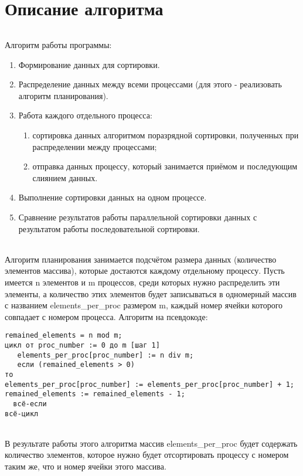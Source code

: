 \documentclass[12pt,a4paper]{article}
\begin{document}
\part*{Описание алгоритма}
\paragraph{}Алгоритм работы программы:
\begin{enumerate} 
\item Формирование данных для сортировки.
\item Распределение данных между всеми процессами (для этого - реализовать алгоритм планирования).
\item Работа каждого отдельного процесса:
\begin{enumerate}
    \item сортировка данных алгоритмом поразрядной сортировки, полученных при распределении между процессами;
    \item отправка данных процессу, который занимается приёмом и последующим слиянием данных.
\end{enumerate}
\item Выполнение сортировки данных на одном процессе.
\item Сравнение результатов работы параллельной сортировки данных с результатом работы последовательной сортировки.
\end{enumerate} 
\paragraph{}Алгоритм планирования занимается подсчётом размера данных (количество элементов массива), которые достаются каждому отдельному процессу. Пусть имеется n элементов и m процессов, среди которых нужно распределить эти элементы, а количество этих элементов будет записываться в одномерный массив с названием elements\_per\_proc размером m, каждый номер ячейки которого совпадает с номером процесса. Алгоритм на псевдокоде:
\begin{lstlisting}
remained_elements = n mod m;
цикл от proc_number := 0 до m [шаг 1]
   elements_per_proc[proc_number] := n div m;
   если (remained_elements > 0) 
то
elements_per_proc[proc_number] := elements_per_proc[proc_number] + 1;
remained_elements := remained_elements - 1;
  всё-если
всё-цикл
\end{lstlisting}
\paragraph{}В результате работы этого алгоритма массив elements\_per\_proc будет содержать количество элементов, которое нужно будет отсортировать процессу с номером таким же, что и номер ячейки этого массива.
\end{document}
